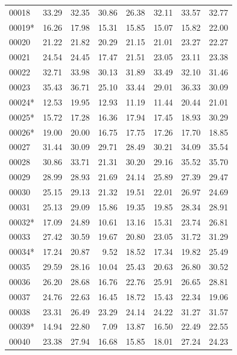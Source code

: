 \documentclass[11pt,a4paper]{article}
\begin{document}
\begin{table}[H]
\begin{tabular}{@{}lrrrrrrr@{}}
00018 & 33.29 & 32.35 & 30.86 & 26.38 & 32.11 & 33.57 & 32.77 \\
00019* & 16.26 & 17.98 & 15.31 & 15.85 & 15.07 & 15.82 & 22.00 \\
00020 & 21.22 & 21.82 & 20.29 & 21.15 & 21.01 & 23.27 & 22.27 \\
00021 & 24.54 & 24.45 & 17.47 & 21.51 & 23.05 & 23.11 & 23.38 \\
00022 & 32.71 & 33.98 & 30.13 & 31.89 & 33.49 & 32.10 & 31.46 \\
00023 & 35.43 & 36.71 & 25.10 & 33.44 & 29.01 & 36.33 & 30.09 \\
00024* & 12.53 & 19.95 & 12.93 & 11.19 & 11.44 & 20.44 & 21.01 \\
00025* & 15.72 & 17.28 & 16.36 & 17.94 & 17.45 & 18.93 & 30.29 \\
00026* & 19.00 & 20.00 & 16.75 & 17.75 & 17.26 & 17.70 & 18.85 \\
00027 & 31.44 & 30.09 & 29.71 & 28.49 & 30.21 & 34.09 & 35.54 \\
00028 & 30.86 & 33.71 & 21.31 & 30.20 & 29.16 & 35.52 & 35.70 \\
00029 & 28.99 & 28.93 & 21.69 & 24.14 & 25.89 & 27.39 & 29.47 \\
00030 & 25.15 & 29.13 & 21.32 & 19.51 & 22.01 & 26.97 & 24.69 \\
00031 & 25.13 & 29.09 & 15.86 & 19.35 & 19.85 & 28.34 & 28.91 \\
00032* & 17.09 & 24.89 & 10.61 & 13.16 & 15.31 & 23.74 & 26.81 \\
00033 & 27.42 & 30.59 & 19.67 & 20.80 & 23.05 & 31.72 & 31.29 \\
00034* & 17.24 & 20.87 & 9.52 & 18.52 & 17.34 & 19.82 & 25.49 \\
00035 & 29.59 & 28.16 & 10.04 & 25.43 & 20.63 & 26.80 & 30.52 \\
00036 & 26.20 & 28.68 & 16.76 & 22.76 & 25.91 & 26.65 & 28.81 \\
00037 & 24.76 & 22.63 & 16.45 & 18.72 & 15.43 & 22.34 & 19.06 \\
00038 & 23.31 & 26.49 & 23.29 & 24.14 & 24.22 & 31.27 & 31.57 \\
00039* & 14.94 & 22.80 & 7.09 & 13.87 & 16.50 & 22.49 & 22.55 \\
00040 & 23.38 & 27.94 & 16.68 & 15.85 & 18.01 & 27.24 & 24.23 \\
\bottomrule
\end{tabular}
\end{table}
\end{document}
